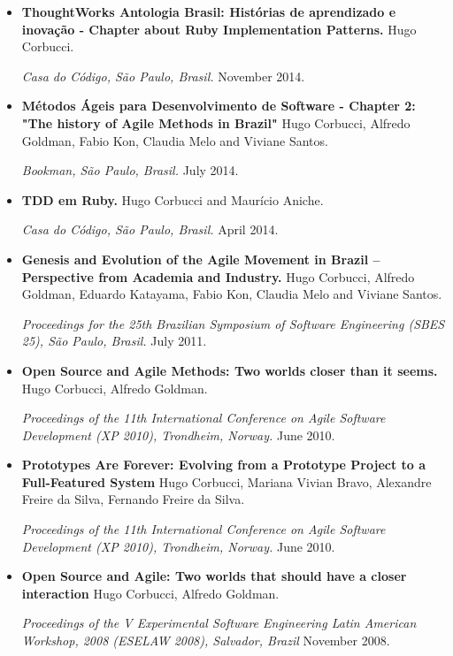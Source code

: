 \documentclass[letter,10pt]{article}
\begin{document}
\begin{itemize}
\item \textbf{ThoughtWorks Antologia Brasil: Histórias de
    aprendizado e inovação - Chapter about Ruby Implementation Patterns.} Hugo Corbucci.

  \textit{Casa do Código, São Paulo, Brasil.} November 2014.

\item \textbf{Métodos Ágeis para Desenvolvimento de Software - Chapter 2: "The history of Agile Methods in Brazil"} Hugo Corbucci,
        Alfredo Goldman, Fabio Kon, Claudia Melo and Viviane Santos.

  \textit{Bookman, São Paulo, Brasil.} July 2014.

\item \textbf{TDD em Ruby.} Hugo Corbucci and Maurício Aniche.

  \textit{Casa do Código, São Paulo, Brasil.} April 2014.

\item \textbf{Genesis and Evolution of the Agile Movement in Brazil
        – Perspective from Academia and Industry.} Hugo Corbucci,
        Alfredo Goldman, Eduardo Katayama, Fabio Kon, Claudia Melo
        and Viviane Santos.

  \textit{Proceedings for the 25th Brazilian Symposium of Software
     Engineering (SBES 25), São Paulo, Brasil.} July 2011.

\item \textbf{Open Source and Agile Methods: Two worlds closer than it
    seems.} Hugo Corbucci, Alfredo Goldman.

  \textit{Proceedings of the 11th International Conference on Agile
    Software Development (XP 2010), Trondheim, Norway.} June 2010.

\item \textbf{Prototypes Are Forever: Evolving from a Prototype
    Project to a Full-Featured System} Hugo Corbucci, Mariana Vivian
  Bravo, Alexandre Freire da Silva, Fernando Freire da Silva.

  \textit{Proceedings of the 11th International Conference on Agile
    Software Development (XP 2010), Trondheim, Norway.} June 2010.

\item \textbf{Open Source and Agile: Two worlds that should have a
    closer interaction} Hugo Corbucci, Alfredo Goldman.

  \textit{Proceedings of the V Experimental Software Engineering Latin
    American Workshop, 2008 (ESELAW 2008), Salvador, Brazil} November
  2008.


\end{itemize}
\end{document}
